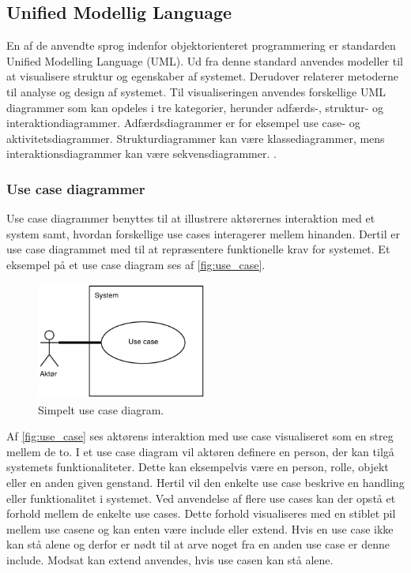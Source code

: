 \subsection{Unified Modellig Language}
En af de anvendte sprog indenfor objektorienteret programmering er standarden Unified Modelling Language (UML). Ud fra denne standard anvendes modeller til at visualisere struktur og egenskaber af systemet. Derudover relaterer metoderne til analyse og design af systemet. Til visualiseringen anvendes forskellige UML diagrammer som kan opdeles i tre kategorier, herunder adfærds-, struktur- og interaktiondiagrammer.  Adfærdsdiagrammer er for eksempel use case- og  aktivitetsdiagrammer. Strukturdiagrammer kan være klassediagrammer, mens interaktionsdiagrammer kan være sekvensdiagrammer. \cite{Fowler2004, Williams2004}.


\subsubsection{Use case diagrammer} 
Use case diagrammer benyttes til at illustrere aktørernes interaktion med et system samt, hvordan forskellige use cases interagerer mellem hinanden. Dertil er use case diagrammet med til at repræsentere funktionelle krav for systemet. \cite{Williams2004} Et eksempel på et use case diagram ses af \autoref{fig:use_case}.

\begin{figure} [H]
\centering
\includegraphics[width=0.5\textwidth]{figures/USE_CASE2}
\caption{Simpelt use case diagram.}
\label{fig:use_case}
\end{figure}

\noindent
Af \autoref{fig:use_case} ses aktørens interaktion med use case visualiseret som en streg mellem de to. I et use case diagram vil aktøren definere en person, der kan tilgå systemets funktionaliteter. Dette kan eksempelvis være en person, rolle, objekt eller en anden given genstand. Hertil vil den enkelte use case beskrive en handling eller funktionalitet i systemet. Ved anvendelse af flere use cases kan der opstå et forhold mellem de enkelte use cases. Dette forhold visualiseres med en stiblet pil mellem use casene og kan enten være include eller extend. Hvis en use case ikke kan stå alene og derfor er nødt til at arve noget fra en anden use case er denne include. Modsat kan extend anvendes, hvis use casen kan stå alene. \cite{Fowler2004, Williams2004}


